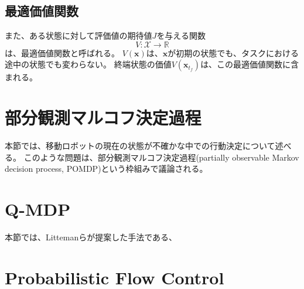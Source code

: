 \subsection{最適価値関数}
また、ある状態に対して評価値の期待値$J$を与える関数
\begin{equation}
\label{value function}
  V : \mathcal{X} \rightarrow \mathbb{R}
\end{equation}
は、最適価値関数と呼ばれる。
$V(\bm{x})$は、$\bm{x}$が初期の状態でも、タスクにおける途中の状態でも変わらない。
終端状態の価値$V(\bm{x}_{t_{f}})$は、この最適価値関数に含まれる。


\section{部分観測マルコフ決定過程}
本節では、移動ロボットの現在の状態が不確かな中での行動決定について述べる。
このような問題は、部分観測マルコフ決定過程(partially observable Markov decision process, POMDP)という枠組みで議論される。


\section{Q-MDP}
本節では、Littemanらが提案した手法である、


\section{Probabilistic Flow Control}
